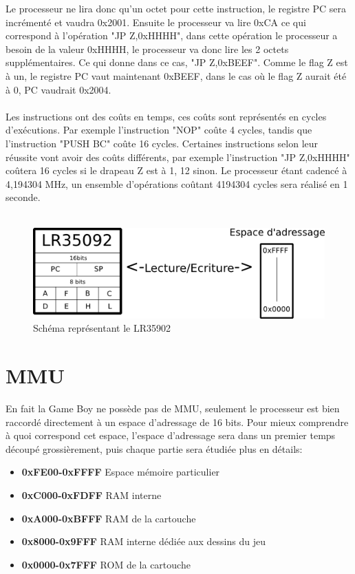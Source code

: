\documentclass[french]{report}
\begin{document}
Le processeur ne lira donc qu'un octet pour cette instruction, le registre PC sera incrémenté et vaudra 0x2001.
Ensuite le processeur va lire 0xCA ce qui correspond à l'opération "JP Z,0xHHHH", dans cette opération le processeur a besoin de la valeur 0xHHHH, le processeur va donc lire les 2 octets supplémentaires. Ce qui donne dans ce cas, "JP Z,0xBEEF".
Comme le flag Z est à un, le registre PC vaut maintenant 0xBEEF, dans le cas où le flag Z aurait été à 0, PC vaudrait 0x2004.\\\\
Les instructions ont des coûts en temps, ces coûts sont représentés en cycles d'exécutions.
Par exemple l'instruction "NOP" coûte 4 cycles, tandis que l'instruction "PUSH BC" coûte 16 cycles.
Certaines instructions selon leur réussite vont avoir des coûts différents, par exemple l'instruction "JP Z,0xHHHH" coûtera 16 cycles si le drapeau Z est à 1, 12 sinon.
Le processeur étant cadencé à 4,194304 MHz, un ensemble d'opérations coûtant 4194304 cycles sera réalisé en 1 seconde.
\\\\
\begin{figure}[!h]
\centering
\includegraphics[scale=0.80]{images/schema_cpu.png}
\caption{Schéma représentant le LR35902}
\end{figure}

\section{MMU}
En fait la Game Boy ne possède pas de \gls{MMU}, seulement le processeur est bien raccordé directement à un espace d'adressage de 16 bits.
Pour mieux comprendre à quoi correspond cet espace, l'espace d'adressage sera
dans un premier temps découpé grossièrement, puis chaque partie sera étudiée
plus en détails:\\
\begin{itemize}
\item \textbf{0xFE00-0xFFFF} Espace mémoire particulier
\item \textbf{0xC000-0xFDFF} \gls{RAM} interne
\item \textbf{0xA000-0xBFFF} RAM de la cartouche
\item \textbf{0x8000-0x9FFF} RAM interne dédiée aux dessins du jeu
\item \textbf{0x0000-0x7FFF} \gls{ROM} de la cartouche
\end{itemize}
\end{document}
